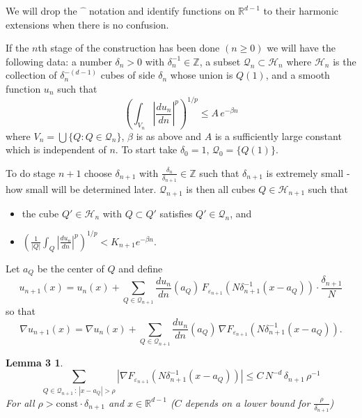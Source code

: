 \documentclass[11pt,reqno]{amsart}
\newtheorem*{lemC}{Lemma 3}
\newcommand{\Rdm}{\mathbb{R}^{d-1}}
\newcommand{\dn}[1]{\frac{d#1}{dn}}
\begin{document}
We will drop the $\widehat{\phantom{x}}$ notation and identify functions on $\Rdm$
to their harmonic extensions when there is no confusion.

If the $n$th stage of the construction has been done $(n\geq 0)$ we will have the
following data: a number $\delta_n>0$ with $\delta_n^{-1}\in\mathbb{Z}$, a subset
$\mathcal{Q}_n\subset\mathcal{H}_n$ where $\mathcal{H}_n$ is the collection of
$\delta_n^{-(d-1)}$ cubes of side $\delta_n$ whose union is $Q(1)$, and a smooth
function $u_n$ such that
\begin{equation*}
 \left(\int_{V_n}\left|\dn{u_n}\right|^{p}\right)^{1/p}\leq A\,e^{-\beta n}
\end{equation*}
where $V_n=\bigcup\{Q:Q\in\mathcal{Q}_n\}$, $\beta$ is as above and $A$ is a
sufficiently large constant which is independent of $n$.  To start take
$\delta_0=1$, $\mathcal{Q}_0=\{Q(1)\}$.

To do stage $n+1$ choose $\delta_{n+1}$ with
$\frac{\delta_n}{\delta_{n+1}}\in\mathbb{Z}$ such that $\delta_{n+1}$ is extremely
small - how small will be determined later.  $\mathcal{Q}_{n+1}$ is then all cubes
$Q\in\mathcal{H}_{n+1}$ such that
\begin{itemize}
\item[(a)] the cube $Q'\in\mathcal{H}_n$ with $Q\subset Q'$ satisfies
  $Q'\in\mathcal{Q}_n$, and
\item[(b)] $\displaystyle\left(\frac{1}{|Q|}\int_Q\left|\dn{u_n}\right|^{p}\right)^{1/p}
  < K_{n+1}e^{-\beta n}.$
\end{itemize}

Let $a_Q$ be the center of $Q$ and define
\begin{equation*}
 u_{n+1}(x)=u_n(x)+\sum_{Q\in\mathcal{Q}_{n+1}}\dn{u_n}(a_Q)\,
   F_{\varepsilon_{n+1}}\!\left(N\delta_{n+1}^{-1}(x-a_Q)\right)\cdot\frac{\delta_{n+1}}{N}
\end{equation*}
so that
\begin{equation*}
 \nabla u_{n+1}(x)=\nabla u_n(x)+\sum_{Q\in\mathcal{Q}_{n+1}}\dn{u_n}(a_Q)\,
   \nabla F_{\varepsilon_{n+1}}\!\left(N\delta_{n+1}^{-1}(x-a_Q)\right).
\end{equation*}

\begin{lemC}
\begin{equation*}
 \sum_{Q\in\mathcal{Q}_{n+1}\,:\,|x-a_Q|>\rho}
  \left|\nabla F_{\varepsilon_{n+1}}\!\left(N\delta_{n+1}^{-1}(x-a_Q)\right)\right|
  \leq C\,N^{-d}\,\delta_{n+1}\,\rho^{-1}
\end{equation*}
For all $\rho>\mathrm{const}\cdot\delta_{n+1}$ and $x\in\Rdm$ ($C$ depends on a
lower bound for $\frac{\rho}{\delta_{n+1}}$)
\end{lemC}
\end{document}
